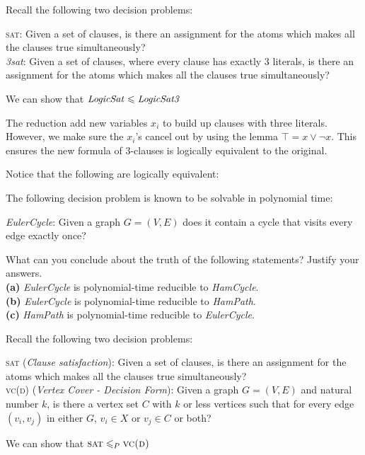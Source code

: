 \begin{example}
Recall the following two decision problems:

\textsc{sat}: Given a set of clauses, is there an 
assignment for the atoms which makes all the clauses true simultaneously? \\
\textit{3sat}: Given a set of clauses, where every clause has exactly 3 literals, 
is there an assignment for the atoms which makes all the clauses true simultaneously?

We can show that $\text{\textit{LogicSat}} \leqslant \text{\textit{LogicSat3}}$

\frmrule

The reduction add new variables $x_i$ to build up clauses with three literals.
However, we make sure the  $x_i$'s cancel out by using the lemma $\top = x \vee \neg x$.
This ensures the new formula of 3-clauses is logically equivalent to the original.

Notice that the following are logically equivalent:


\end{example}




\frmrule

\begin{example}
The following decision problem is known to be solvable in polynomial time:

\textit{EulerCycle}: Given a graph $G = (V, E)$ does it contain a cycle that visits
every edge exactly once?

What can you conclude about the truth of the following statements? Justify
your answers.\\
\textbf{(a)} \textit{EulerCycle} is polynomial-time reducible to \textit{HamCycle}.\\
\textbf{(b)} \textit{EulerCycle} is polynomial-time reducible to \textit{HamPath}.\\
\textbf{(c)} \textit{HamPath} is polynomial-time reducible to \textit{EulerCycle}.
\end{example}


\frmrule




\frmrule




\begin{example}
Recall the following two decision problems:

\textsc{sat} (\textit{Clause satisfaction}): Given a set of clauses, is there an 
assignment for the atoms which makes all the clauses true simultaneously? \\
\textsc{vc(d)} (\textit{Vertex Cover - Decision Form}): Given a graph $G = (V,E)$ and natural number $k$, 
is there a vertex set $C$ with $k$ or less vertices such that for 
every edge $(v_i, v_j)$ in either $G$, $v_i \in X$ or $v_j \in C$ or both?


We can show that $\textsc{sat} \leqslant_P \textsc{vc(d)}$


\end{example}

